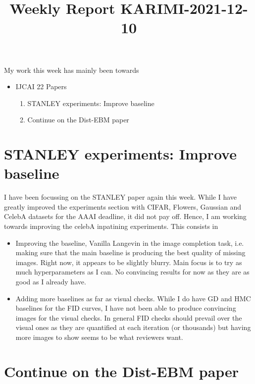 \documentclass{article}
\begin{document}
\title{Weekly Report KARIMI-2021-12-10}


\date{}
\maketitle




My work this week has mainly been towards
\begin{itemize}
\item IJCAI 22 Papers
\begin{enumerate}
	\item STANLEY experiments: Improve baseline
	\item Continue on the Dist-EBM paper
\end{enumerate}
\end{itemize}

\section{STANLEY experiments: Improve baseline}

I have been focussing on the STANLEY paper again this week.
While I have greatly improved the experiments section with CIFAR, Flowers, Gaussian and CelebA datasets for the AAAI deadline, it did not pay off.
Hence, I am working towards improving the celebA inpatining experiments.
This consists in 

\begin{itemize}
\item Improving the baseline, Vanilla Langevin in the image completion task, i.e. making sure that the main baseline is producing the best quality of missing images. Right now, it appears to be slightly blurry. Main focus is to try as much hyperparameters as I can. No convincing results for now as they are as good as I already have.
\item Adding more baselines as far as visual checks. While I do have GD and HMC baselines for the FID curves, I have not been able to produce convincing images for the visual checks. 
In general FID checks should prevail over the visual ones as they are quantified at each iteration (or thousands) but having more images to show seems to be what reviewers want.
\end{itemize}



\section{Continue on the Dist-EBM paper}



\end{document}
